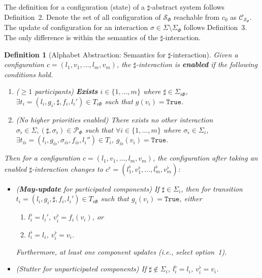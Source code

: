 \documentclass[10pt, a4paper, onecolumn, conference, compsocconf]{IEEEtran}
\newcommand{\pri}{\mathcal{P}}
\newtheorem{defi}{Definition}
\begin{document}
The definition for a configuration (state) of a $\sharp$-abstract system follows Definition~2.
Denote the set of all configuration of $\mathcal{S}_{\Phi}$ reachable from $c_0$ as $\mathcal{C}_{\mathcal{S}_{\Phi}}$.
The update of configuration for an interaction $\sigma \in\Sigma\setminus\Sigma_{\Phi}$ follows Definition~3.
The only difference is within the semantics of the $\sharp$-interaction.

\begin{defi}[Alphabet Abstraction: Semantics for $\sharp$-interaction]\label{def:sharp.semantics}
Given a configuration $c=(l_1, v_1, \ldots, l_m, v_m)$, the $\sharp$-interaction is \textbf{enabled} if the following conditions hold.
\begin{enumerate}
    \item ($\geq 1$ participants) \textbf{Exists} $i \in \{1,\ldots, m\}$ where $\sharp \in \Sigma_{i\Phi}$, $\exists t_i = (l_i,g_i,\sharp,f_i,l_i') \in T_{i\Phi}$ such that $g(v_i) = \texttt{True}$.
    \item (No higher priorities enabled) There exists no other interaction $\sigma_{\flat} \in \Sigma, (\sharp, \sigma_{\flat}) \in \pri_{\Phi}$ such that $\forall i \in \{1,\ldots, m\}$ where $\sigma_{\flat} \in \Sigma_i$, $\exists t_{i\flat} = (l_i ,g_{i\flat},\sigma_{i\flat},f_{i\flat},l_i'') \in T_i$, $g_{i\flat}(v_i) = \texttt{True}$.
\end{enumerate}
Then for a configuration $c=(l_1, v_1, \ldots, l_m, v_m)$, the configuration after taking an enabled $\sharp$-interaction changes to
$c^{\flat} = (l_1^{\flat}, v_1^{\flat}, \ldots, l_m^{\flat}, v_m^{\flat})$:
\begin{itemize}
    \item (\textbf{May-update} for participated components) If $\sharp \in \Sigma_i$, then for transition $t_i = (l_i,g_i,\sharp,f_i,l_i') \in T_{i\Phi}$ such that $g_i(v_i) = \texttt{True}$, either
        \begin{enumerate}
        \item $l_i^{\flat} = l_i'$, $v_i^{\flat} = f_i(v_i)$, or
        \item $l_i^{\flat} = l_i$, $v_i^{\flat} = v_i$.
        \end{enumerate}
        Furthermore, at least one component updates (i.e., select option~1).
    \item (Stutter for unparticipated components) If $\sharp \not\in \Sigma_i$, $l_i^{\flat} = l_i$, $v_i^{\flat} = v_i$.
\end{itemize}
\end{defi}
\end{document}
